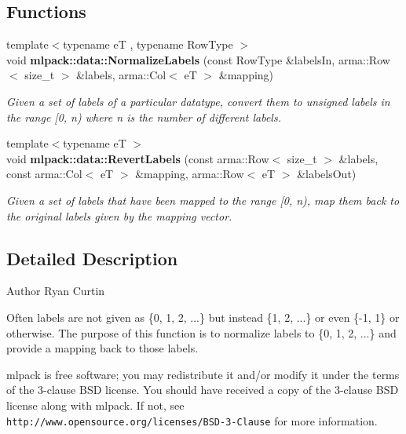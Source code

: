 \subsection*{Functions}
\begin{DoxyCompactItemize}
\item 
{\footnotesize template$<$typename eT , typename Row\+Type $>$ }\\void {\bf mlpack\+::data\+::\+Normalize\+Labels} (const Row\+Type \&labels\+In, arma\+::\+Row$<$ size\+\_\+t $>$ \&labels, arma\+::\+Col$<$ eT $>$ \&mapping)
\begin{DoxyCompactList}\small\item\em Given a set of labels of a particular datatype, convert them to unsigned labels in the range [0, n) where n is the number of different labels. \end{DoxyCompactList}\item 
{\footnotesize template$<$typename eT $>$ }\\void {\bf mlpack\+::data\+::\+Revert\+Labels} (const arma\+::\+Row$<$ size\+\_\+t $>$ \&labels, const arma\+::\+Col$<$ eT $>$ \&mapping, arma\+::\+Row$<$ eT $>$ \&labels\+Out)
\begin{DoxyCompactList}\small\item\em Given a set of labels that have been mapped to the range [0, n), map them back to the original labels given by the \textquotesingle{}mapping\textquotesingle{} vector. \end{DoxyCompactList}\end{DoxyCompactItemize}


\subsection{Detailed Description}
\begin{DoxyAuthor}{Author}
Ryan Curtin
\end{DoxyAuthor}
Often labels are not given as \{0, 1, 2, ...\} but instead \{1, 2, ...\} or even \{-\/1, 1\} or otherwise. The purpose of this function is to normalize labels to \{0, 1, 2, ...\} and provide a mapping back to those labels.

mlpack is free software; you may redistribute it and/or modify it under the terms of the 3-\/clause B\+SD license. You should have received a copy of the 3-\/clause B\+SD license along with mlpack. If not, see {\tt http\+://www.\+opensource.\+org/licenses/\+B\+S\+D-\/3-\/\+Clause} for more information. 